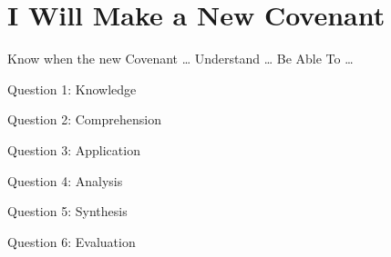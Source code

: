 \chapter{I Will Make a New Covenant}

\begin{goals}
\goal Know when the new Covenant \ldots
\goal Understand \ldots
\goal Be Able To \ldots
\end{goals}

\intro

\lipsum[4]

\bible

\begin{quote}
\lipsum[4] 
\end{quote}

\begin{quote}
\lipsum[4] 
\end{quote}

\begin{quote}
\lipsum[4] 
\end{quote}

\begin{quote}
\lipsum[4] 
\end{quote}

\discussion

\lipsum[5-7]

\questions

Question 1: Knowledge
\vfill

Question 2: Comprehension
\vfill

Question 3: Application
\vfill

Question 4: Analysis
\vfill

Question 5: Synthesis
\vfill

Question 6: Evaluation
\vfill